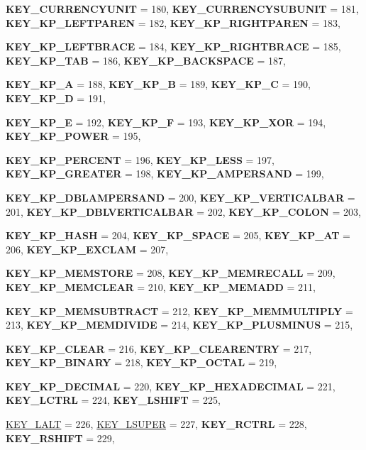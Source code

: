 \begin{DoxyCompactItemize}
{\bfseries KEY\_\-CURRENCYUNIT} =  180, 
{\bfseries KEY\_\-CURRENCYSUBUNIT} =  181, 
{\bfseries KEY\_\-KP\_\-LEFTPAREN} =  182, 
{\bfseries KEY\_\-KP\_\-RIGHTPAREN} =  183, 
\par
{\bfseries KEY\_\-KP\_\-LEFTBRACE} =  184, 
{\bfseries KEY\_\-KP\_\-RIGHTBRACE} =  185, 
{\bfseries KEY\_\-KP\_\-TAB} =  186, 
{\bfseries KEY\_\-KP\_\-BACKSPACE} =  187, 
\par
{\bfseries KEY\_\-KP\_\-A} =  188, 
{\bfseries KEY\_\-KP\_\-B} =  189, 
{\bfseries KEY\_\-KP\_\-C} =  190, 
{\bfseries KEY\_\-KP\_\-D} =  191, 
\par
{\bfseries KEY\_\-KP\_\-E} =  192, 
{\bfseries KEY\_\-KP\_\-F} =  193, 
{\bfseries KEY\_\-KP\_\-XOR} =  194, 
{\bfseries KEY\_\-KP\_\-POWER} =  195, 
\par
{\bfseries KEY\_\-KP\_\-PERCENT} =  196, 
{\bfseries KEY\_\-KP\_\-LESS} =  197, 
{\bfseries KEY\_\-KP\_\-GREATER} =  198, 
{\bfseries KEY\_\-KP\_\-AMPERSAND} =  199, 
\par
{\bfseries KEY\_\-KP\_\-DBLAMPERSAND} =  200, 
{\bfseries KEY\_\-KP\_\-VERTICALBAR} =  201, 
{\bfseries KEY\_\-KP\_\-DBLVERTICALBAR} =  202, 
{\bfseries KEY\_\-KP\_\-COLON} =  203, 
\par
{\bfseries KEY\_\-KP\_\-HASH} =  204, 
{\bfseries KEY\_\-KP\_\-SPACE} =  205, 
{\bfseries KEY\_\-KP\_\-AT} =  206, 
{\bfseries KEY\_\-KP\_\-EXCLAM} =  207, 
\par
{\bfseries KEY\_\-KP\_\-MEMSTORE} =  208, 
{\bfseries KEY\_\-KP\_\-MEMRECALL} =  209, 
{\bfseries KEY\_\-KP\_\-MEMCLEAR} =  210, 
{\bfseries KEY\_\-KP\_\-MEMADD} =  211, 
\par
{\bfseries KEY\_\-KP\_\-MEMSUBTRACT} =  212, 
{\bfseries KEY\_\-KP\_\-MEMMULTIPLY} =  213, 
{\bfseries KEY\_\-KP\_\-MEMDIVIDE} =  214, 
{\bfseries KEY\_\-KP\_\-PLUSMINUS} =  215, 
\par
{\bfseries KEY\_\-KP\_\-CLEAR} =  216, 
{\bfseries KEY\_\-KP\_\-CLEARENTRY} =  217, 
{\bfseries KEY\_\-KP\_\-BINARY} =  218, 
{\bfseries KEY\_\-KP\_\-OCTAL} =  219, 
\par
{\bfseries KEY\_\-KP\_\-DECIMAL} =  220, 
{\bfseries KEY\_\-KP\_\-HEXADECIMAL} =  221, 
{\bfseries KEY\_\-LCTRL} =  224, 
{\bfseries KEY\_\-LSHIFT} =  225, 
\par
\hyperlink{classphys_1_1MetaCode_a3e501cbb5bf0f6f1fdb7211465bda8d8a2454f5b9aa3d9f34db185fe659f3e751}{KEY\_\-LALT} =  226, 
\hyperlink{classphys_1_1MetaCode_a3e501cbb5bf0f6f1fdb7211465bda8d8aab77afaba4fc97faa9b9fe40d3a9ebbb}{KEY\_\-LSUPER} =  227, 
{\bfseries KEY\_\-RCTRL} =  228, 
{\bfseries KEY\_\-RSHIFT} =  229, 

\end{DoxyCompactItemize}

